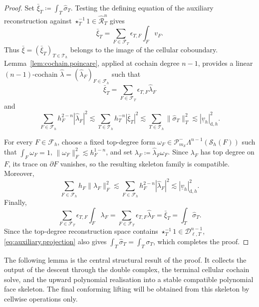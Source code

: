 \documentclass[a4paper,11pt]{article}
\theoremstyle{definition}
\newcommand{\DIFF}{\mathrm{d}}
\newcommand{\Sh}{\mathcal{S}_h}
\newcommand{\PLtrim}[2]{\mathcal{P}_{#1}^{-}\Lambda^{#2}}
\newcommand{\Dpoly}[2]{\mathcal D_{\ell,#1}^{#2}}
\newcommand{\epsTF}{\epsilon_{T,F}}
\begin{document}
\begin{proof}
Set $\bar\xi_T \coloneqq \int_T\widehat\sigma_T$.
Testing the defining equation of the auxiliary reconstruction against $\star_T^{-1}1\in\widehat{\mathcal R}_T^n$ gives
\[
  \bar\xi_T
  =
  \sum_{F\in\mathcal F_T}
  \epsTF
  \int_Fv_F.
\]
Thus $\bar\xi=(\bar\xi_T)_{T\in\mathcal T_h}$ belongs to the image of the cellular coboundary.
Lemma~\ref{lem:cochain.poincare}, applied at cochain degree $n-1$, provides a linear $(n-1)$-cochain $\widehat\lambda=(\widehat\lambda_F)_{F\in\mathcal F_h}$ such that
\[
  \bar\xi_T
  =
  \sum_{F\in\mathcal F_T}
  \epsTF\widehat\lambda_F
\]
and
\[
  \sum_{F\in\mathcal F_h}
  h_F^{2-n}|\widehat\lambda_F|^2
  \lesssim
  \sum_{T\in\mathcal T_h}
  h_T^{-n}|\bar\xi_T|^2
  \lesssim
  \sum_{T\in\mathcal T_h}
  \|\widehat\sigma_T\|_T^2
  \lesssim
  |\underline v_h|_{\DIFF,h}^2.
\]

For every $F\in\mathcal F_h$, choose a fixed top-degree form $\omega_F \in \PLtrim{m_{\mathcal S}}{n-1}(\Sh(F))$ such that $\int_F\omega_F=1$, $\|\omega_F\|_F^2 \lesssim h_F^{1-n}$, and set $\lambda_F \coloneqq \widehat\lambda_F\omega_F$.
Since $\lambda_F$ has top degree on $F$, its trace on $\partial F$ vanishes, so the resulting skeleton family is compatible.
Moreover,
\[
  \sum_{F\in\mathcal F_h}
  h_F\|\lambda_F\|_F^2
  \lesssim
  \sum_{F\in\mathcal F_h}
  h_F^{2-n}|\widehat\lambda_F|^2
  \lesssim
  |\underline v_h|_{\DIFF,h}^2.
\]
Finally,
\[
  \sum_{F\in\mathcal F_T}
  \epsTF
  \int_F\lambda_F
  =
  \sum_{F\in\mathcal F_T}
  \epsTF\widehat\lambda_F
  =
  \bar\xi_T
  =
  \int_T\widehat\sigma_T.
\]
Since the top-degree reconstruction space contains $\star_T^{-1}1\in\Dpoly{T}{n-1}$, \eqref{eq:auxiliary.projection} also gives $\int_T\widehat\sigma_T = \int_T\sigma_T$, which completes the proof.
\end{proof}

The following lemma is the central structural result of the proof.
It collects the output of the descent through the double complex, the terminal cellular cochain solve, and the upward polynomial realisation into a stable compatible polynomial face skeleton.
The final conforming lifting will be obtained from this skeleton by cellwise operations only.
\end{document}
